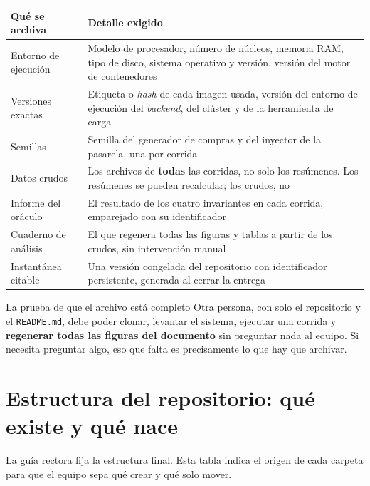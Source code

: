 \documentclass[11pt,a4paper]{article}
\begin{document}
\begin{center}
	\small
	\begin{tabular}{@{}p{4.4cm}p{10.5cm}@{}}
		\toprule
		\textbf{Qué se archiva} & \textbf{Detalle exigido} \\
		\midrule
		Entorno de ejecución & Modelo de procesador, número de núcleos, memoria RAM, tipo de disco, sistema operativo y versión, versión del motor de contenedores \\
		\addlinespace
		Versiones exactas & Etiqueta o \emph{hash} de cada imagen usada, versión del entorno de ejecución del \emph{backend}, del clúster y de la herramienta de carga \\
		\addlinespace
		Semillas & Semilla del generador de compras y del inyector de la pasarela, una por corrida \\
		\addlinespace
		Datos crudos & Los archivos de \textbf{todas} las corridas, no solo los resúmenes. Los resúmenes se pueden recalcular; los crudos, no \\
		\addlinespace
		Informe del oráculo & El resultado de los cuatro invariantes en cada corrida, emparejado con su identificador \\
		\addlinespace
		Cuaderno de análisis & El que regenera todas las figuras y tablas a partir de los crudos, sin intervención manual \\
		\addlinespace
		Instantánea citable & Una versión congelada del repositorio con identificador persistente, generada al cerrar la entrega \\
		\bottomrule
	\end{tabular}
\end{center}

\begin{defBox}{La prueba de que el archivo está completo}
	Otra persona, con solo el repositorio y el \texttt{README.md}, debe poder clonar, levantar el sistema, ejecutar una corrida y \textbf{regenerar todas las figuras del documento} sin preguntar nada al equipo. Si necesita preguntar algo, eso que falta es precisamente lo que hay que archivar.
\end{defBox}


\section{Estructura del repositorio: qué existe y qué nace}

La guía rectora fija la estructura final. Esta tabla indica el origen de cada carpeta para que el equipo sepa qué crear y qué solo mover.
\end{document}

